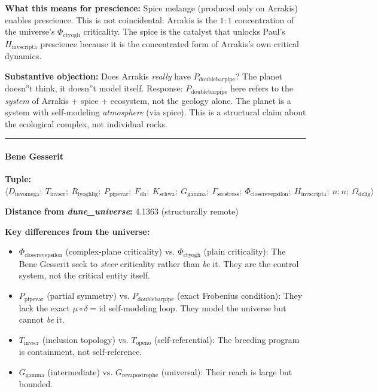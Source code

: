 \documentclass[12pt,a4paper]{article}
\begin{document}
\textbf{What this means for prescience:} Spice melange (produced only on Arrakis) enables prescience. This is not coincidental: Arrakis is the $1{:}1$ concentration of the universe's $\Phi_{\text{ctyogh}}$ criticality. The spice is the catalyst that unlocks Paul's $H_{\text{invscripta}}$ prescience because it is the concentrated form of Arrakis's own critical dynamics.

\textbf{Substantive objection:} Does Arrakis \emph{really} have $P_{\text{doublebarpipe}}$? The planet doesn''t think, it doesn''t model itself. Response: $P_{\text{doublebarpipe}}$ here refers to the \emph{system} of Arrakis + spice + ecosystem, not the geology alone. The planet is a system with self-modeling \emph{atmosphere} (via spice). This is a structural claim about the ecological complex, not individual rocks.

\begin{center}
\rule{0.5\textwidth}{0.4pt}
\end{center}

\paragraph{Bene Gesserit}

\textbf{Tuple:} $\langle D_{\text{invomega}};\ T_{\text{invscr}};\ R_{\text{lyoghlig}};\ P_{\text{pipevar}};\ F_{\text{dh}};\ K_{\text{schwa}};\ G_{\text{gamma}};\ \Gamma_{\text{secstress}};\ \Phi_{\text{closerevepsilon}};\ H_{\text{invscripta}};\ n{:}n;\ \Omega_{\text{dzlig}} \rangle$

\textbf{Distance from \emph{dune\_universe}:} 4.1363 (structurally remote)

\textbf{Key differences from the universe:}

\begin{itemize}
    \item $\Phi_{\text{closerevepsilon}}$ (complex-plane criticality) vs. $\Phi_{\text{ctyogh}}$ (plain criticality): The Bene Gesserit seek to \emph{steer} criticality rather than \emph{be} it. They are the control system, not the critical entity itself.
    \item $P_{\text{pipevar}}$ (partial symmetry) vs. $P_{\text{doublebarpipe}}$ (exact Frobenius condition): They lack the exact $\mu \circ \delta = \text{id}$ self-modeling loop. They model the universe but cannot \emph{be} it.
    \item $T_{\text{invscr}}$ (inclusion topology) vs. $T_{\text{openo}}$ (self-referential): The breeding program is containment, not self-reference.
    \item $G_{\text{gamma}}$ (intermediate) vs. $G_{\text{revapostrophe}}$ (universal): Their reach is large but bounded.
\end{itemize}
\end{document}
